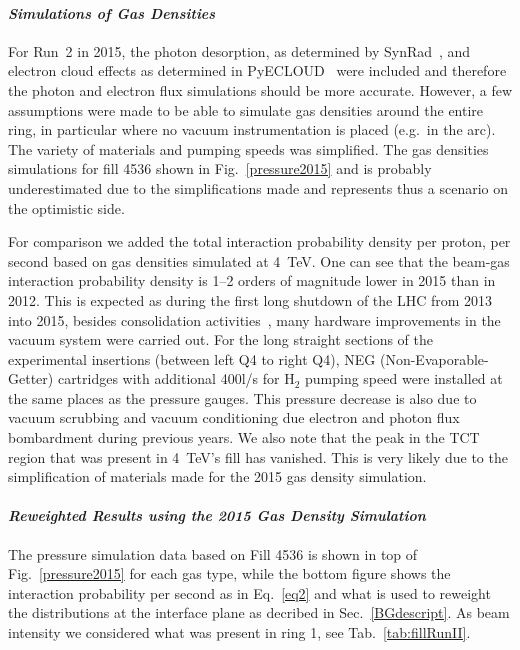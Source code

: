 \paragraph{\textit{Simulations of Gas Densities}}
For Run~2 in 2015, the photon desorption, as determined by SynRad~\cite{synradRef}, and electron cloud effects as determined in PyECLOUD~\cite{giovanniPhd} were included and therefore the photon and electron flux simulations should be more accurate. However, a few assumptions were made to be able to simulate gas densities around the entire ring, in particular where no vacuum instrumentation is placed (e.g.~in the arc). The variety of materials and pumping speeds was simplified. The gas densities simulations for fill 4536 shown in Fig.~\ref{pressure2015} and is probably underestimated due to the simplifications made and represents thus a scenario on the optimistic side. 

For comparison we added the total interaction probability density per proton, per second based on gas densities simulated at 4~TeV. One can see that the beam-gas interaction probability density is 1--2 orders of magnitude lower in 2015 than in 2012. This is expected as during the first long shutdown of the LHC from 2013 into 2015, besides consolidation activities~\cite{KatyForazIpac14}, many hardware improvements in the vacuum system were carried out. For the long straight sections of the experimental insertions (between left Q4 to right Q4), NEG (Non-Evaporable-Getter) cartridges with additional 400l/s for H$_2$ pumping speed were installed at the same places as the pressure gauges. This pressure decrease is also due to vacuum scrubbing and vacuum conditioning due electron and photon flux bombardment during previous years. We also note that the peak in the TCT region that was present in 4~TeV's fill has vanished. This is very likely due to the simplification of materials made for the 2015 gas density simulation.


\paragraph{\textit{Reweighted Results using the 2015 Gas Density Simulation}}

The pressure simulation data based on Fill 4536 is shown in top of Fig.~\ref{pressure2015} for each gas type, while the bottom figure shows the interaction probability per second as in Eq.~\ref{eq2} and what is used to reweight the distributions at the interface plane as decribed in Sec.~\ref{BGdescript}. As beam intensity we considered what was present in ring 1, see Tab.~\ref{tab:fillRunII}.


